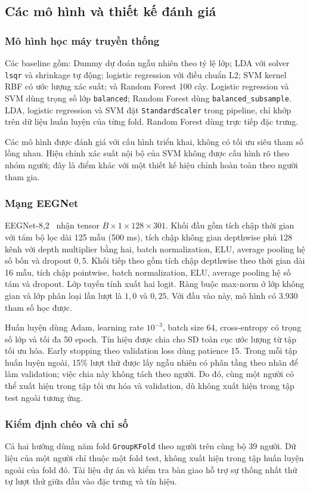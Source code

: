 \documentclass[11pt,a4paper]{article}
\newcommand{\code}[1]{\nolinkurl{#1}}
\begin{document}
\subsection{Các mô hình và thiết kế đánh giá}
\subsubsection{Mô hình học máy truyền thống}
Các baseline gồm: Dummy dự đoán ngẫu nhiên theo tỷ lệ lớp; LDA với solver \code{lsqr} và shrinkage tự động; logistic regression với điều chuẩn L2; SVM kernel RBF có ước lượng xác suất; và Random Forest 100 cây. Logistic regression và SVM dùng trọng số lớp \code{balanced}; Random Forest dùng \code{balanced_subsample}. LDA, logistic regression và SVM đặt \code{StandardScaler} trong pipeline, chỉ khớp trên dữ liệu huấn luyện của từng fold. Random Forest dùng trực tiếp đặc trưng.

Các mô hình được đánh giá với cấu hình triển khai, không có tối ưu siêu tham số lồng nhau. Hiệu chỉnh xác suất nội bộ của SVM không được cấu hình rõ theo nhóm người; đây là điểm khác với một thiết kế hiệu chỉnh hoàn toàn theo người tham gia.

\subsubsection{Mạng EEGNet}
EEGNet-8,2~\cite{eegnet} nhận tensor $B\times1\times128\times301$. Khối đầu gồm tích chập thời gian với tám bộ lọc dài 125 mẫu (500 ms), tích chập không gian depthwise phủ 128 kênh với depth multiplier bằng hai, batch normalization, ELU, average pooling hệ số bốn và dropout $0{,}5$. Khối tiếp theo gồm tích chập depthwise theo thời gian dài 16 mẫu, tích chập pointwise, batch normalization, ELU, average pooling hệ số tám và dropout. Lớp tuyến tính xuất hai logit. Ràng buộc max-norm ở lớp không gian và lớp phân loại lần lượt là $1{,}0$ và $0{,}25$. Với đầu vào này, mô hình có 3.930 tham số học được.

Huấn luyện dùng Adam, learning rate $10^{-3}$, batch size 64, cross-entropy có trọng số lớp và tối đa 50 epoch. Tín hiệu được chia cho SD toàn cục ước lượng từ tập tối ưu hóa. Early stopping theo validation loss dùng patience 15. Trong mỗi tập huấn luyện ngoài, 15\% lượt thử được lấy ngẫu nhiên có phân tầng theo nhãn để làm validation; việc chia này không tách theo người. Do đó, cùng một người có thể xuất hiện trong tập tối ưu hóa và validation, dù không xuất hiện trong tập test ngoài tương ứng.

\subsubsection{Kiểm định chéo và chỉ số}
Cả hai hướng dùng năm fold \code{GroupKFold} theo người trên cùng bộ 39 người. Dữ liệu của một người chỉ thuộc một fold test, không xuất hiện trong tập huấn luyện ngoài của fold đó. Tài liệu dự án và kiểm tra bàn giao hỗ trợ sự thống nhất thứ tự lượt thử giữa đầu vào đặc trưng và tín hiệu.
\end{document}
